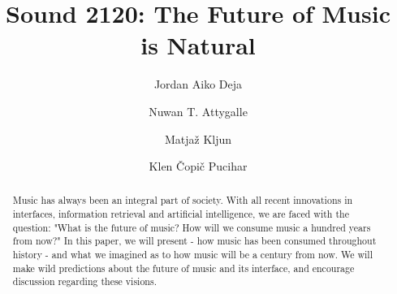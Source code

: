 \documentclass[acmtog]{acmart}
\begin{document}
\title{Sound 2120: The Future of Music is Natural}

\author{Jordan Aiko Deja}
\author{Nuwan T. Attygalle}
\authornotemark[1]

\author{Matjaž Kljun}
\author{Klen Čopič Pucihar}
\authornotemark[1]


\renewcommand{\shortauthors}{Deja and Attygalle, et. al. }

\begin{abstract}
  Music has always been an integral part of society. With all recent innovations in interfaces, information retrieval and artificial intelligence, we are faced with the question: "What is the future of music? How will we consume music a hundred years from now?" In this paper, we will present - how music has been consumed throughout history - and what we imagined as to how music will be a century from now. We will make wild predictions about the future of music and its interface, and encourage discussion regarding these visions. 
\end{abstract}
\end{document}
